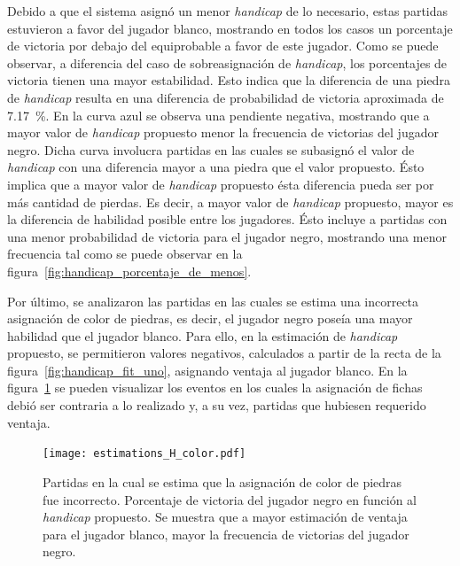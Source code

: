 \documentclass[11pt,twoside, spanish]{report} %
\begin{document}
Debido a que el sistema asign\'o un menor \textit{handicap} de lo necesario, estas partidas estuvieron a favor del jugador blanco, mostrando en todos los casos un porcentaje de victoria por debajo del equiprobable a favor de este jugador.
Como se puede observar, a diferencia del caso de sobreasignaci\'on de \textit{handicap}, los porcentajes de victoria tienen una mayor estabilidad.
Esto indica que la diferencia de una piedra de \textit{handicap} resulta en una diferencia de probabilidad de victoria aproximada de \SI{7.17}{\percent}.
En la curva azul se observa una pendiente negativa, mostrando que a mayor valor de \textit{handicap} propuesto menor la frecuencia de victorias del jugador negro.
Dicha curva involucra partidas en las cuales se subasign\'o el valor de \textit{handicap} con una diferencia mayor a una piedra que el valor propuesto.
\'Esto implica que a mayor valor de \textit{handicap} propuesto \'esta diferencia pueda ser por m\'as cantidad de pierdas.
Es decir, a mayor valor de \textit{handicap} propuesto,  mayor es la diferencia de habilidad posible entre los jugadores.
\'Esto incluye a partidas con una menor probabilidad de victoria para el jugador negro, mostrando una menor frecuencia tal como se puede observar en la figura~\ref{fig:handicap_porcentaje_de_menos}.


Por \'ultimo, se analizaron las partidas en las cuales se estima una incorrecta asignaci\'on de color de piedras, es decir, el jugador negro pose\'ia una mayor habilidad que el jugador blanco.
Para ello, en la estimaci\'on de \textit{handicap} propuesto, se permitieron valores negativos, calculados a partir de la recta de la figura~\ref{fig:handicap_fit_uno}, asignando ventaja al jugador blanco.
En la figura~\ref{fig:estimations_H_color} se pueden visualizar los eventos en los cuales la asignaci\'on de fichas debi\'o ser contraria a lo realizado y, a su vez, partidas que hubiesen requerido ventaja.

\begin{figure}[H]
    \centering
    \texttt{[image: estimations\_H\_color.pdf]}
    \caption{Partidas en la cual se estima que la asignaci\'on de color de piedras fue incorrecto. Porcentaje de victoria del jugador negro en funci\'on al \textit{handicap} propuesto.  Se muestra que a mayor estimaci\'on de ventaja para el jugador blanco,  mayor la frecuencia de victorias del jugador negro.}
    \label{fig:estimations_H_color}
\end{figure}
\end{document}
